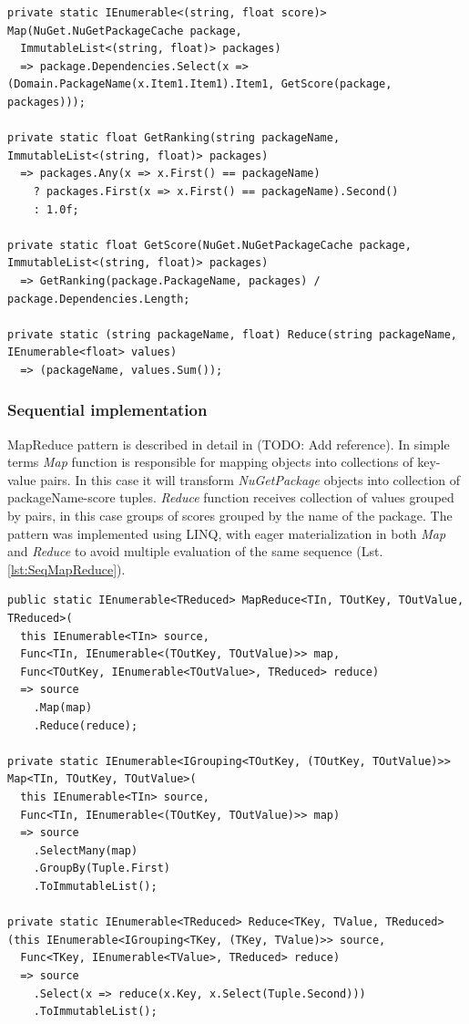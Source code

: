 \begin{lstlisting}[language={[sharp]c}, style=sharpcstyle, caption={Nuget package ranking functions}, label={lst:NugetPackageRanking}]
private static IEnumerable<(string, float score)> Map(NuGet.NuGetPackageCache package,
  ImmutableList<(string, float)> packages)
  => package.Dependencies.Select(x => (Domain.PackageName(x.Item1.Item1).Item1, GetScore(package, packages)));

private static float GetRanking(string packageName, ImmutableList<(string, float)> packages)
  => packages.Any(x => x.First() == packageName)
    ? packages.First(x => x.First() == packageName).Second()
    : 1.0f;

private static float GetScore(NuGet.NuGetPackageCache package, ImmutableList<(string, float)> packages)
  => GetRanking(package.PackageName, packages) / package.Dependencies.Length;

private static (string packageName, float) Reduce(string packageName, IEnumerable<float> values)
  => (packageName, values.Sum());
\end{lstlisting}

\subsubsection{Sequential implementation}
MapReduce pattern is described in detail in (TODO: Add reference). 
In simple terms \emph{Map} function is responsible for mapping objects into collections of key-value pairs. In this case it will transform \emph{NuGetPackage} objects into collection of packageName-score tuples. \emph{Reduce} function receives collection of values grouped by pairs, in this case groups of scores grouped by the name of the package. The pattern was implemented using LINQ, with eager materialization in both \emph{Map} and \emph{Reduce} to avoid multiple evaluation of the same sequence (Lst. \ref{lst:SeqMapReduce}).

\begin{lstlisting}[language={[sharp]c}, style=sharpcstyle, caption={Sequential MapReduce implementation}, label={lst:SeqMapReduce}]
public static IEnumerable<TReduced> MapReduce<TIn, TOutKey, TOutValue, TReduced>(
  this IEnumerable<TIn> source,
  Func<TIn, IEnumerable<(TOutKey, TOutValue)>> map,
  Func<TOutKey, IEnumerable<TOutValue>, TReduced> reduce)
  => source
    .Map(map)
    .Reduce(reduce);

private static IEnumerable<IGrouping<TOutKey, (TOutKey, TOutValue)>> Map<TIn, TOutKey, TOutValue>(
  this IEnumerable<TIn> source,
  Func<TIn, IEnumerable<(TOutKey, TOutValue)>> map)
  => source
    .SelectMany(map)
    .GroupBy(Tuple.First)
    .ToImmutableList();

private static IEnumerable<TReduced> Reduce<TKey, TValue, TReduced>
(this IEnumerable<IGrouping<TKey, (TKey, TValue)>> source,
  Func<TKey, IEnumerable<TValue>, TReduced> reduce)
  => source
    .Select(x => reduce(x.Key, x.Select(Tuple.Second)))
    .ToImmutableList();

\end{lstlisting}

